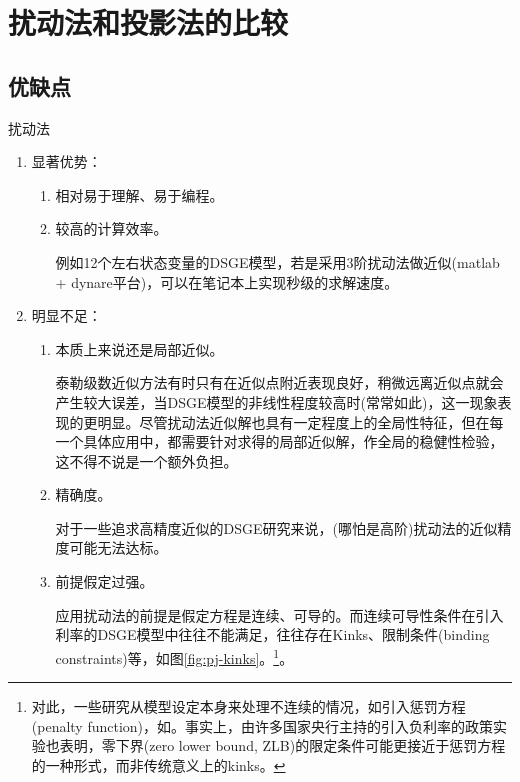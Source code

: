 \chapter{扰动法和投影法的比较}
\label{sec:pt-pj-comp}

\section{优缺点}
\label{sec:pt-pj-comp-analysis}
扰动法
\begin{enumerate}
  \item 显著优势：
  \begin{enumerate}
     \item 相对易于理解、易于编程。
     \item 较高的计算效率。

     例如12个左右状态变量的DSGE模型，若是采用3阶扰动法做近似(matlab + dynare平台)，可以在笔记本上实现秒级的求解速度。
  \end{enumerate}
  \item 明显不足：
  \begin{enumerate}
    \item 本质上来说还是局部近似。

    泰勒级数近似方法有时只有在近似点附近表现良好，稍微远离近似点就会产生较大误差，当DSGE模型的非线性程度较高时(常常如此)，这一现象表现的更明显。尽管扰动法近似解也具有一定程度上的全局性特征\citep{Swanson:2006gy, Aruoba:2006cz, Caldara:2012fr}，但在每一个具体应用中，都需要针对求得的局部近似解，作全局的稳健性检验，这不得不说是一个额外负担。

    \item 精确度。

    对于一些追求高精度近似的DSGE研究来说，(哪怕是高阶)扰动法的近似精度可能无法达标。

    \item 前提假定过强。

    应用扰动法的前提是假定方程是连续、可导的。而连续可导性条件在引入利率的DSGE模型中往往不能满足，往往存在Kinks、限制条件(binding constraints)等，如图\ref{fig:pj-kinks}。\footnote{对此，一些研究从模型设定本身来处理不连续的情况，如引入惩罚方程(penalty function)，如\cite{Preston:2007fu}。事实上，由许多国家央行主持的引入负利率的政策实验也表明，零下界(zero lower bound, ZLB)的限定条件可能更接近于惩罚方程的一种形式，而非传统意义上的kinks。}。
  \end{enumerate}
\end{enumerate}

